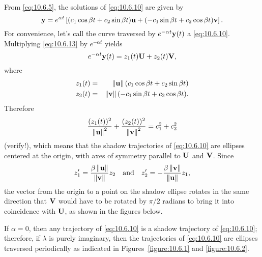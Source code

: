 \documentclass{ximera}
\begin{document}
From \eqref{eq:10.6.5}, the solutions of \eqref{eq:10.6.10} are given by
\begin{equation} \label{eq:10.6.13} {\bf y}=e^{\alpha t}\left[(c_1\cos\beta
t+c_2\sin\beta t){\bf u} +(-c_1\sin\beta t+c_2\cos\beta t){\bf
v}\right]. 
\end{equation} 
For convenience, let's call the curve
traversed by $e^{-\alpha t}{\bf y}(t)$ a 
\eqref{eq:10.6.10}. Multiplying \eqref{eq:10.6.13} by $e^{-\alpha t}$ yields
$$
e^{-\alpha t}{\bf y}(t)=z_1(t){\bf U}+z_2(t){\bf V},
$$
where
\begin{eqnarray*}
z_1(t)&=&\left\lVert{\bf u}\right\rVert(c_1\cos\beta t+c_2\sin\beta
t)\\ z_2(t)&=&\left\lVert{\bf v}\right\rVert(-c_1\sin\beta t+c_2\cos\beta t).
\end{eqnarray*}
Therefore
$$ \frac{(z_1(t))^2}{\left\lVert{\bf
u}\right\rVert^2}+\frac{(z_2(t))^2}{\left\lVert{\bf v}\right\rVert^2} =c_1^2+c_2^2
$$
(verify!), which means that the shadow trajectories of \eqref{eq:10.6.10}
are ellipses centered at the origin, with axes of symmetry parallel to
${\bf U}$ and ${\bf V}$. Since
$$
z_1'=\frac{\beta\left\lVert{\bf u}\right\rVert}{\left\lVert{\bf v}\right\rVert} z_2\quad\mbox{and}\quad
z_2'=-\frac{\beta\left\lVert{\bf v}\right\rVert}{\left\lVert{\bf u}\right\rVert} z_1,
$$
 the vector from the
origin to a point on the shadow ellipse rotates in the same direction
that ${\bf V}$ would have to be rotated by $\pi/2$ radians to bring it
into coincidence with ${\bf U}$, as shown in the figures below.

\begin{center}
\end{center}

\begin{center}
\end{center}




If $\alpha=0$, then any trajectory of \eqref{eq:10.6.10} is a shadow
trajectory of \eqref{eq:10.6.10};  therefore, if $\lambda$ is purely
imaginary, then the trajectories of \eqref{eq:10.6.10} are ellipses
traversed
periodically as indicated in Figures~\ref{figure:10.6.1} and
\ref{figure:10.6.2}.
\end{document}
